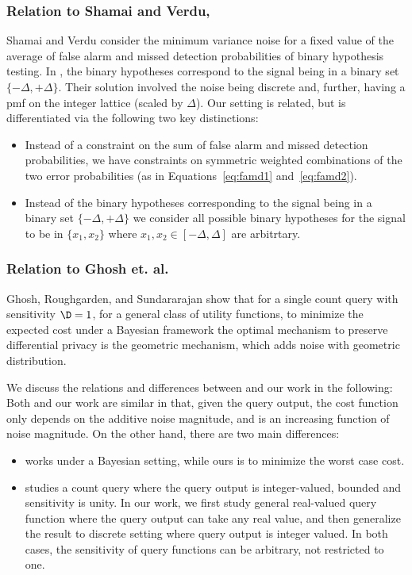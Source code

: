\subsubsection{Relation to Shamai and Verdu, \cite{SV92}}
Shamai and Verdu \cite{SV92} consider the minimum variance noise for a fixed value of the average of false alarm and missed detection probabilities of binary hypothesis testing. In \cite{SV92}, the binary hypotheses correspond to the signal being in a binary set $\{ -\Delta, +\Delta\}$. Their solution involved the noise being discrete and, further, having a pmf on the integer lattice (scaled by $\Delta$). Our setting is related, but is differentiated via the following two key distinctions:
\begin{itemize}
\item Instead of a constraint on the sum of false alarm and missed detection probabilities, we have constraints on symmetric weighted combinations of the two error probabilities (as in Equations~\eqref{eq:famd1} and~\eqref{eq:famd2}).
\item Instead of the binary hypotheses corresponding to the signal being in a binary set $\{-\Delta, +\Delta\}$ we consider all possible binary hypotheses for the signal to be in $\{ x_1, x_2\}$ where $x_1, x_2 \in [-\Delta, \Delta]$ are arbitrtary.
\end{itemize}



\subsubsection{Relation to Ghosh et. al. \cite{Ghosh09} }


Ghosh, Roughgarden, and Sundararajan  \cite{Ghosh09} show that for a single count query with sensitivity $\D = 1$, for a general class of utility functions, to minimize the expected cost under a Bayesian framework the optimal mechanism to preserve differential privacy is the geometric mechanism, which adds noise with geometric distribution.

We discuss the relations and differences between \cite{Ghosh09} and our work in the following: Both \cite{Ghosh09} and our work are similar in that,  given the query output, the cost function only depends on the additive noise magnitude, and is an increasing function of noise magnitude. On the other hand, there are two main differences:
\begin{itemize}

	\item \cite{Ghosh09}  works under a Bayesian setting, while ours is to minimize the worst case cost.

	\item \cite{Ghosh09} studies a count query where the query output is integer-valued, bounded and sensitivity is unity.  In our work,  we first study general real-valued query function where the query output can take any real value, and then generalize the result to discrete setting where query output is integer valued.  In both cases, the sensitivity of query functions can be arbitrary, not restricted to one.
\end{itemize}


